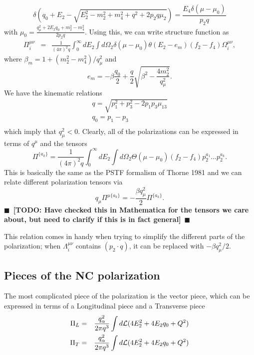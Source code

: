 \documentclass[12pt,letter]{article}
\newcommand{\script}[1]{\begin{cal} #1 \end{cal} }
\newcommand{\todo}[1]{{$\blacksquare$~\textbf{\color{blue}[TODO: #1]}}~$\blacksquare$}
\begin{document}
\begin{equation*}
\delta\left(q_0 + E_2 - \sqrt{E_2^2 - m_2^2 + m_4^2 + q^2 + 2 p_2 q \mu_2} \right) 
= \frac{E_4 \delta(\mu - \mu_0)}{p_2 q} 
\end{equation*} 
with $\mu_0 = \frac{q_\mu^2 + 2 E_2 q_0 + m_2^2 - m_4^2}{2 p_2 q}$.  Using this, we can write structure function as 
\begin{eqnarray*}
\Pi^{\mu \nu}_{i} &=& \frac{1}{(4 \pi)^2 q} \int_{0}^\infty dE_2 
\int d \Omega_2 \delta(\mu - \mu_0) \theta(E_2-e_{m})
(f_2 - f_4) \Omega_i^{\mu \nu},
\end{eqnarray*} 
where $\beta_m = 1 + (m_2^2 - m_4^2)/q_\mu^2$ and
\begin{equation}
e_{m}=-\beta \frac{q_0}{2} + \frac{q}{2} \sqrt{\beta^2 - \frac{4 m_2^2}{q_\mu^2}}.
\end{equation}  
We have the kinematic relations
\begin{eqnarray*}
q = \sqrt{p_1^2 + p_3^2 - 2 p_1 p_3 \mu_{13}} \\
q_0 = p_1 - p_3 \\ 
\end{eqnarray*}
which imply that $q_\mu^2 < 0$. Clearly, all of the polarizations can be expressed
in terms of $q^\mu$ and the tensors
\begin{equation}
\Pi^{\{a_k\}} = \frac{1}{(4\pi)^2 q} \int_0^\infty dE_2 \int d\Omega_2 
\Theta(\mu-\mu_0) (f_2 - f_4) p_2^{a_1}...p_2^{a_k}.
\end{equation}
This is basically the same as the PSTF formalism of Thorne 1981 and we can relate
different polarization tensors via 
\begin{equation}
q_\mu \Pi^{\mu \{a_k\}} = - \frac{\beta q_\mu^2}{2}\Pi^{ \{a_k\}}.
\end{equation}
\todo{Have checked this in Mathematica for the tensors we care about, but need 
to clarify if this is in fact general}

This relation comes in handy when trying to simplify the different parts of the 
polarization; when $\Lambda^{\mu \nu}_i$ contains $(p_2 \cdot q)$, it can be
replaced with $-\beta q_\mu^2/2$.

\subsection{Pieces of the NC polarization}
The most complicated piece of the polarization is the vector piece, which can be 
expressed in terms of a Longitudinal piece and a Transverse piece 
\begin{eqnarray}
\Pi_L &=& \frac{q_\alpha^2}{2 \pi q^3}
\int d \script{L} (4 E_2^2 + 4 E_2 q_0 + Q^2) \\
\Pi_T &=& \frac{q_\alpha^2}{2 \pi q^3}
\int d \script{L} (4 E_2^2 + 4 E_2 q_0 + Q^2)
\end{eqnarray}
\end{document}
